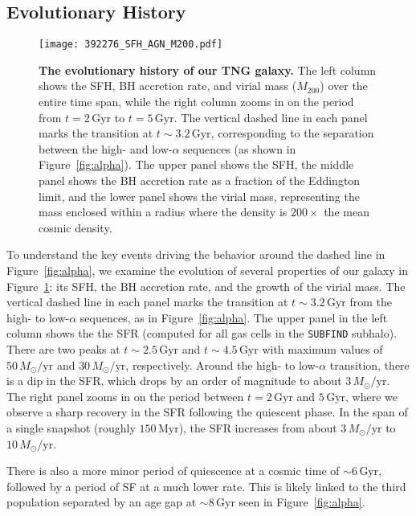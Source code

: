 \documentclass[twocolumn]{aastex631}
\newcommand{\Msun}{\ensuremath{M_{\odot}}}
\newcommand{\Gyr}{\ensuremath{\textrm{Gyr}}}
\newcommand{\Myr}{\ensuremath{\textrm{Myr}}}
\begin{document}
\subsection{Evolutionary History}\label{ssec:evol}
\begin{figure}
  \centering
  \texttt{[image: 392276\_SFH\_AGN\_M200.pdf]}
  \caption{\textbf{The evolutionary history of our TNG galaxy.} The left column shows the SFH, BH accretion rate, and virial mass ($M_{200}$) over the entire time span, while the right column zooms in on the period from $t=2\,\Gyr$ to $t=5\,\Gyr$. The vertical dashed line in each panel marks the transition at $t\sim3.2\,\Gyr$, corresponding to the separation between the high- and low-$\alpha$ sequences (as shown in Figure~\ref{fig:alpha}). The upper panel shows the SFH, the middle panel shows the BH accretion rate as a fraction of the Eddington limit, and the lower panel shows the virial mass, representing the mass enclosed within a radius where the density is $200\times$ the mean cosmic density.}
  \label{fig:history}
\end{figure}

To understand the key events driving the behavior around the dashed line in Figure~\ref{fig:alpha}, we examine the evolution of several properties of our galaxy in Figure~\ref{fig:history}: its SFH, the BH accretion rate, and the growth of the virial mass. The vertical dashed line in each panel marks the transition at $t\sim3.2\,\Gyr$ from the high- to low-$\alpha$ sequences, as in Figure~\ref{fig:alpha}. The upper panel in the left column shows the the SFR (computed for all gas cells in the \texttt{SUBFIND} subhalo). There are two peaks at $t\sim2.5\,\Gyr$ and $t\sim4.5\,\Gyr$ with maximum values of $50\,\Msun/\textrm{yr}$ and $30\,\Msun/\textrm{yr}$, respectively. Around the high- to low-$\alpha$ transition, there is a dip in the SFR, which drops by an order of magnitude to about $3\,\Msun/\textrm{yr}$. The right panel zooms in on the period between $t=2\,\Gyr$ and $5\,\Gyr$, where we observe a sharp recovery in the SFR following the quiescent phase. In the span of a single snapshot (roughly $150\,\Myr$), the SFR increases from about $3\,\Msun/\textrm{yr}$ to $10\,\Msun/\textrm{yr}$.

There is also a more minor period of quiescence at a cosmic time of $\sim6\,\Gyr$, followed by a period of SF at a much lower rate. This is likely linked to the third population separated by an age gap at $\sim8\,\Gyr$ seen in Figure~\ref{fig:alpha}.
\end{document}
